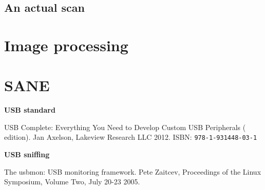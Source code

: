 \documentclass{article}
\begin{document}
\subsection{An actual scan}


\section{Image processing}
\label{sec:imgproc}

\section{SANE}

\pagebreak

\renewcommand{\refname}{References}
\begin{thebibliography}{}

  \item[]\hspace{-\labelwidth}\hspace{-\labelsep}\textbf{USB standard}

   USB Complete: Everything You Need to Develop
               Custom USB Peripherals ( edition).
               Jan Axelson, Lakeview Research LLC 2012.
               ISBN: {\tt   978-1-931448-03-1}
               
  \item[]\hspace{-\labelwidth}\hspace{-\labelsep}\textbf{USB sniffing}
  
   The usbmon: USB monitoring framework. Pete Zaitcev,
  Proceedings of the Linux Symposium, Volume Two, July 20-23 2005.
  \setcounter{firstbib}{\value{enumiv}}
\end{thebibliography}
\end{document}
